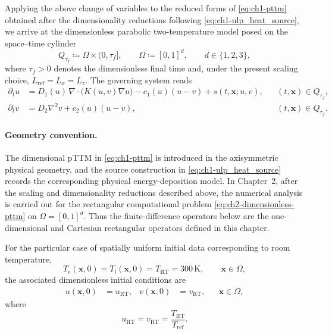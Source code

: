Applying the above change of variables to the reduced forms of \eqref{eq:ch1-pttm} obtained after the dimensionality reductions following \eqref{eq:ch1-ulp_heat_source}, we arrive at the dimensionless parabolic two-temperature model posed on the space--time cylinder
\[
    Q_{\tau_f} \coloneqq \Omega \times (0,\tau_f],
    \qquad
    \Omega \coloneqq [0,1]^d,
    \qquad
    d\in\{1,2,3\},
\]
where \(\tau_f>0\) denotes the dimensionless final time and, under the present scaling choice, \(L_{\mathrm{ref}}=L_x=L_z\).
The governing system reads
\begin{subequations}\label{eq:ch2-dimensionless-pttm}
    \begin{align}
        \partial_t u
         & =
        D_1(u)\,\nabla\!\cdot\!\bigl(K(u,v)\nabla u\bigr)
        - c_1(u)(u-v)
        + s(t,\mathbf{x};u,v),
         &   &
        (t,\mathbf{x})\in Q_{\tau_f},
        \label{eq:ch2-dimensionless-pttm-e}
        \\
        \partial_t v
         & =
        D_2 \nabla^2 v
        + c_2(u)(u-v),
         &   &
        (t,\mathbf{x})\in Q_{\tau_f}.
        \label{eq:ch2-dimensionless-pttm-l}
    \end{align}
\end{subequations}

\paragraph{Geometry convention.}
The dimensional pTTM in \eqref{eq:ch1-pttm} is introduced in the axisymmetric physical geometry, and the source construction in \eqref{eq:ch1-ulp_heat_source} records the corresponding physical energy-deposition model. In Chapter~2, after the scaling and dimensionality reductions described above, the numerical analysis is carried out for the rectangular computational problem \eqref{eq:ch2-dimensionless-pttm} on \(\Omega=[0,1]^d\). Thus the finite-difference operators below are the one-dimensional and Cartesian rectangular operators defined in this chapter.

For the particular case of spatially uniform initial data corresponding to room temperature,
\[
    T_e(\mathbf{x},0)=T_l(\mathbf{x},0)=T_{\mathrm{RT}}=300\,\mathrm{K},
    \qquad \mathbf{x}\in\Omega,
\]
the associated dimensionless initial conditions are
\begin{align}
    u(\mathbf{x},0) & = u_{\mathrm{RT}},
                    &
    v(\mathbf{x},0) & = v_{\mathrm{RT}},
                    &                    & \mathbf{x}\in\Omega,
\end{align}
where
\[
    u_{\mathrm{RT}} = v_{\mathrm{RT}} = \frac{T_{\mathrm{RT}}}{T_{\mathrm{ref}}}.
\]

